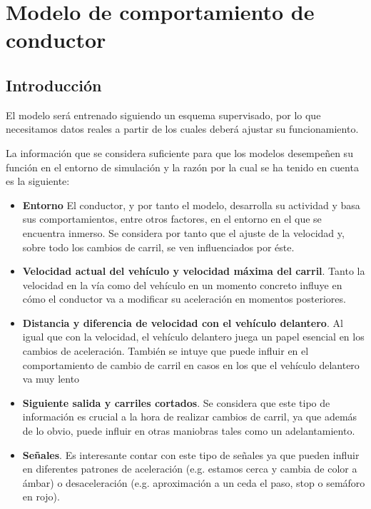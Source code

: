 \chapter{Modelo de comportamiento de conductor}
\label{ch:behavior-model}

\section{Introducción}



El modelo será entrenado siguiendo un esquema supervisado, por lo que necesitamos datos reales a partir de los cuales deberá ajustar su funcionamiento.

La información que se considera suficiente para que los modelos desempeñen su función en el entorno de simulación y la razón por la cual se ha tenido en cuenta es la siguiente:

\begin{itemize}
	\item \textbf{Entorno} El conductor, y por tanto el modelo, desarrolla su actividad y basa sus comportamientos, entre otros factores, en el entorno en el que se encuentra inmerso. Se considera por tanto que el ajuste de la velocidad y, sobre todo los cambios de carril, se ven influenciados por éste.
	\item \textbf{Velocidad actual del vehículo y velocidad máxima del carril}. Tanto la velocidad en la vía como del vehículo en un momento concreto influye en cómo el conductor va a modificar su aceleración en momentos posteriores.
	\item \textbf{Distancia y diferencia de velocidad con el vehículo delantero}. Al igual que con la velocidad, el vehículo delantero juega un papel esencial en los cambios de aceleración. También se intuye que puede influir en el comportamiento de cambio de carril en casos en los que el vehículo delantero va muy lento
	\item \textbf{Siguiente salida y carriles cortados}. Se considera que este tipo de información es crucial a la hora de realizar cambios de carril, ya que además de lo obvio, puede influir en otras maniobras tales como un adelantamiento.
	\item \textbf{Señales}. Es interesante contar con este tipo de señales ya que pueden influir en diferentes patrones de aceleración (e.g. estamos cerca y cambia de color a ámbar) o desaceleración (e.g. aproximación a un ceda el paso, stop o semáforo en rojo).
\end{itemize}

